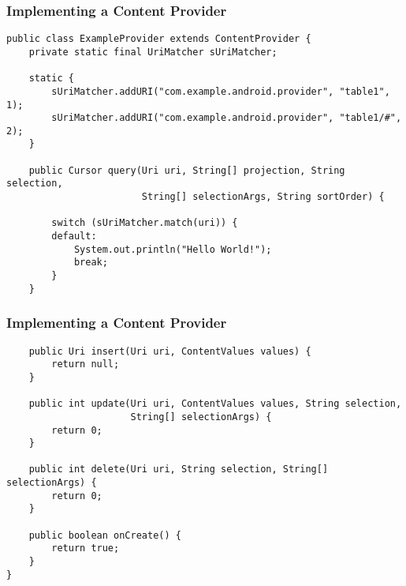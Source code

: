 \begin{frame}[fragile]
  \frametitle{Implementing a Content Provider}
\begin{verbatim}
public class ExampleProvider extends ContentProvider {
    private static final UriMatcher sUriMatcher;

    static {
        sUriMatcher.addURI("com.example.android.provider", "table1", 1);
        sUriMatcher.addURI("com.example.android.provider", "table1/#", 2);
    }

    public Cursor query(Uri uri, String[] projection, String selection,
                        String[] selectionArgs, String sortOrder) {

        switch (sUriMatcher.match(uri)) {
        default:
            System.out.println("Hello World!");
            break;
        }
    }
\end{verbatim}
\end{frame}

\begin{frame}[fragile]
  \frametitle{Implementing a Content Provider}
\begin{verbatim}
    public Uri insert(Uri uri, ContentValues values) {
        return null;
    }

    public int update(Uri uri, ContentValues values, String selection,
                      String[] selectionArgs) {
        return 0;
    }

    public int delete(Uri uri, String selection, String[] selectionArgs) {
        return 0;
    }

    public boolean onCreate() {
        return true;
    }
}
\end{verbatim}
\end{frame}

